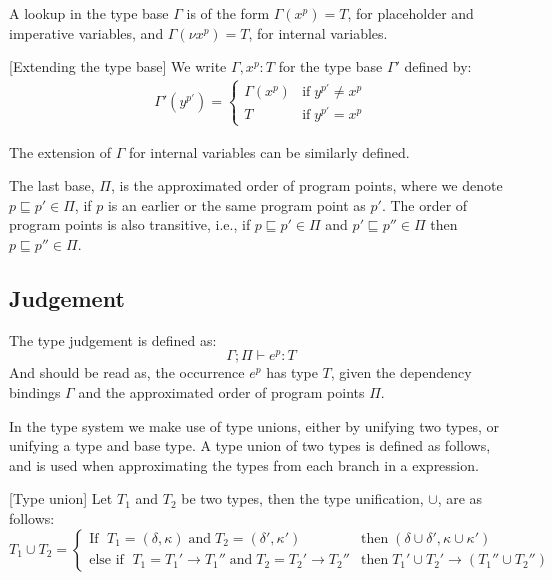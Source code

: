 \documentclass[../../master.tex]{subfiles}
\begin{document}
A lookup in the type base $\Gamma$ is of the form $\Gamma(x^p)=T$, for placeholder and imperative variables, and $\Gamma(\nu x^p)=T$, for internal variables.

\begin{definition}{[Extending the type base]}
	We write $\Gamma,x^p:T$ for the type base $\Gamma'$ defined by:
	\begin{align*}
		\Gamma'(y^{p'})=
		\left\{\begin{matrix}
			\Gamma(x^p) & \mbox{if}\;y^{p'} \neq x^{p}\\ 
			T & \mbox{if}\;y^{p'} = x^{p}
		\end{matrix}\right.
	\end{align*}
\end{definition}
The extension of $\Gamma$ for internal variables can be similarly defined.
\bigskip

The last base, $\Pi$, is the approximated order of program points, where we denote $p\sqsubseteq p'\in\Pi$, if $p$ is an earlier or the same program point as $p'$.
The order of program points is also transitive, i.e., if $p\sqsubseteq p'\in\Pi$ and $p'\sqsubseteq p''\in\Pi$ then $p\sqsubseteq p''\in\Pi$.


\subsection{Judgement}
The type judgement is defined as:
$$\Gamma;\Pi\vdash e^p: T$$
And should be read as, the occurrence $e^p$ has type $T$, given the dependency bindings $\Gamma$ and the approximated order of program points $\Pi$.

In the type system we make use of type unions, either by unifying two types, or unifying a type and base type.
A type union of two types is defined as follows, and is used when approximating the types from each branch in a  expression.
\begin{definition}{[Type union]}
	Let $T_1$ and $T_2$ be two types, then the type unification, $\cup$, are as follows:
	\begin{equation*}
		T_1\cup T_2=
		\left\{\begin{matrix}
			\mbox{If } \; T_1=(\delta,\kappa) \;\mbox{and}\; T_2=(\delta',\kappa')  & \mbox{then} \; (\delta\cup\delta',\kappa\cup\kappa')\\
			\mbox{else if } \; T_1=T_1'\rightarrow T_1''\;\mbox{and}\;T_2=T_2'\rightarrow T_2'' & \mbox{then} \; T_1'\cup T_2'\rightarrow (T_1''\cup T_2'')
		\end{matrix}\right.
	\end{equation*}
\end{definition}
\end{document}
